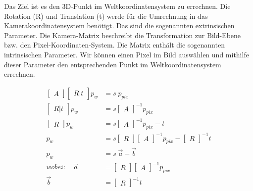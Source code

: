 		Das Ziel ist es den 3D-Punkt im Weltkoordinatensystem zu errechnen. Die Rotation (R) und Translation (t) werde für die Umrechnung in das Kamerakoordinatensystem benötigt. Das sind die sogenannten extrinsischen Parameter. Die Kamera-Matrix beschreibt die Transformation zur Bild-Ebene bzw. den Pixel-Koordinaten-System. Die Matrix enthält die sogenannten intrinsischen Parameter. Wir können einen Pixel im Bild auswählen und mithilfe dieser Parameter den entsprechenden Punkt im Weltkoordinatensystem errechnen.
		
		\begin{equation}
			\begin{aligned}
				 \begin{bmatrix} A \end{bmatrix} \begin{bmatrix} R|t \end{bmatrix} p_w &= s \; p_{pix} \\
				 \begin{bmatrix} R|t \end{bmatrix} p_w &= s \begin{bmatrix} A \end{bmatrix}^{-1} p_{pix} \\
				 \begin{bmatrix} R \end{bmatrix} p_w &= s \begin{bmatrix} A \end{bmatrix}^{-1} p_{pix} - t \\
				 p_w &= s \begin{bmatrix} R \end{bmatrix} \begin{bmatrix} A \end{bmatrix}^{-1} p_{pix} - \begin{bmatrix} R \end{bmatrix}^{-1} t \\
				 p_w &= s \; \vec{a} - \vec{b} \\
				 wobei: \quad \vec{a} & = \begin{bmatrix} R \end{bmatrix} \begin{bmatrix} A \end{bmatrix}^{-1} p_{pix} \\
				 \vec{b} &= \begin{bmatrix} R \end{bmatrix}^{-1} t
			\end{aligned}
			\label{eq:pixel_zu_welt}
		\end{equation}
		
